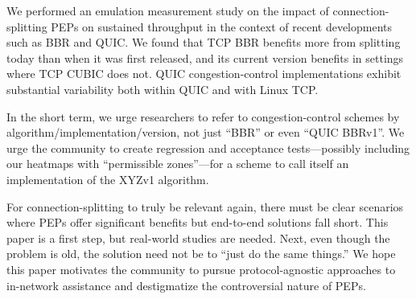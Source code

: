We performed an emulation measurement study on the impact of
connection-splitting PEPs on sustained throughput in the context of recent
developments such as BBR and QUIC. We found that TCP BBR benefits more from
splitting today than when it was first released, and its current version
benefits in settings where TCP CUBIC does not. QUIC congestion-control
implementations exhibit substantial variability both within QUIC and with
Linux TCP.

In the short term, we urge researchers to refer to congestion-control schemes
by algorithm/implementation/version, not just ``BBR'' or even ``QUIC BBRv1''.
We urge the community to create regression and acceptance tests---possibly
including our heatmaps with ``permissible zones''---for a scheme to call
itself an implementation of the XYZv1 algorithm.

For connection-splitting to truly be relevant again, there must be clear
scenarios where PEPs offer significant benefits but end-to-end solutions fall
short. This paper is a first step, but real-world studies are needed. Next,
even though the problem is old, the solution need not be to ``just do the same
things.'' We hope this paper motivates the community to pursue
protocol-agnostic approaches to in-network assistance and destigmatize the
controversial nature of PEPs.
